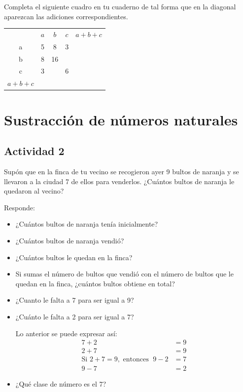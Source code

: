 \documentclass[10pt,twoside]{article}
\begin{document}
\begin{enumerate}
\begin{minipage}{.45\textwidth}
\item Completa el siguiente cuadro en tu cuaderno de tal forma que en la diagonal
aparezcan las adiciones correspondientes.
\end{minipage}\hfill
\begin{minipage}{.45\textwidth}
\begin{tabular}{ccccc}
 & $a$ & $b$ & $c$ & $a+b+c$ \\ 
\cline{2-5} 
a & \vline \hfill 5 \hfill \vline & 8 \hfill \vline & 3 \hfill \vline & \hfill \vline   \\ \cline{2-5}
b & \vline \hfill 8 \hfill \vline & 16 \hfill \vline & \hfill \vline & \\ \cline{2-4}
c & \vline \hfill 3 \hfill \vline & \hfill \vline & 6 \hfill \vline & \\ \cline{2-4}
$a+b+c$ &  \vline \hfill \hspace*{10pt} \hfill \vline & & \\ \cline{2-2}
\end{tabular} 
\end{minipage}
\end{enumerate}
\section*{Sustracci\'on de n\'umeros naturales}
\subsection*{Actividad 2}
Supón que en la finca de tu vecino se recogieron ayer 9 bultos de naranja y se
llevaron a la ciudad 7 de ellos para venderlos. ¿Cuántos bultos de naranja le
quedaron al vecino?

Responde:
\begin{itemize}
\item ¿Cuántos bultos de naranja tenía inicialmente?
\item ¿Cuántos bultos de naranja vendió?
\item ¿Cuántos bultos le quedan en la finca?
\item Si sumas el número de bultos que vendió con el número de bultos que le
    quedan en la finca, ¿cuántos bultos obtiene en total?
\item ¿Cuanto le falta a 7 para ser igual a 9?
\item ¿Cuánto le falta a 2 para ser igual a 7?

Lo anterior se puede expresar así: 
\begin{align*}
7 + 2 &= 9\\
2+7&=9\\
\mbox{Si } 2+7=9, \mbox{ entonces }\; 9-2&=7\\
9-7&=2 
\end{align*}
\item ¿Qué clase de número es el 7?
\end{itemize}
\end{document}
